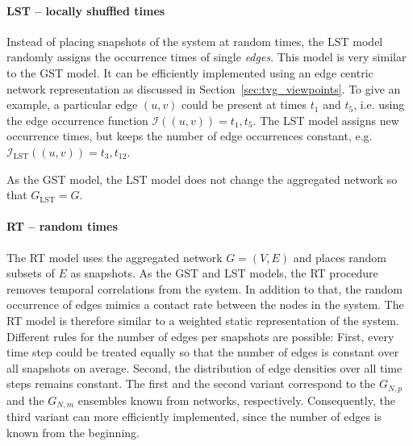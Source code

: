 \paragraph{LST -- locally shuffled times\color{Cayenne}{.}}
Instead of placing snapshots of the system at random times, the LST model randomly assigns the occurrence times of single \emph{edges}.
This model is very similar to the GST model.
It can be efficiently implemented using an edge centric network representation as discussed in Section~\ref{sec:tvg_viewpoints}.
To give an example, a particular edge $(u,v)$ could be present at times $t_1$ and $t_5$, i.e. using the edge occurrence function $\mathcal{I}((u,v))=t_1,t_5$.
The LST model assigns new occurrence times, but keeps the number of edge occurrences constant, e.g. $\mathcal{I}_\mathrm{LST} ((u,v))=t_3,t_{12}$.

As the GST model, the LST model does not change the aggregated network so that $G_\mathrm{LST}=G$.

\paragraph{RT -- random times\color{Cayenne}{.}}
The RT model uses the aggregated network $G=(V,E)$ and places random subsets of $E$ as snapshots.
As the GST and LST models, the RT procedure removes temporal correlations from the system.
In addition to that, the random occurrence of edges mimics a contact rate between the nodes in the system.
The RT model is therefore similar to a weighted static representation of the system.
Different rules for the number of edges per snapshots are possible:
First, every time step could be treated equally so that the number of edges is constant over all snapshots on average.
Second, the distribution of edge densities over all time steps remains constant.
The first and the second variant correspond to the $G_{N,p}$ and the $G_{N,m}$ ensembles known from \ER networks, respectively.
Consequently, the third variant can more efficiently implemented, since the number of edges is known from the beginning.

